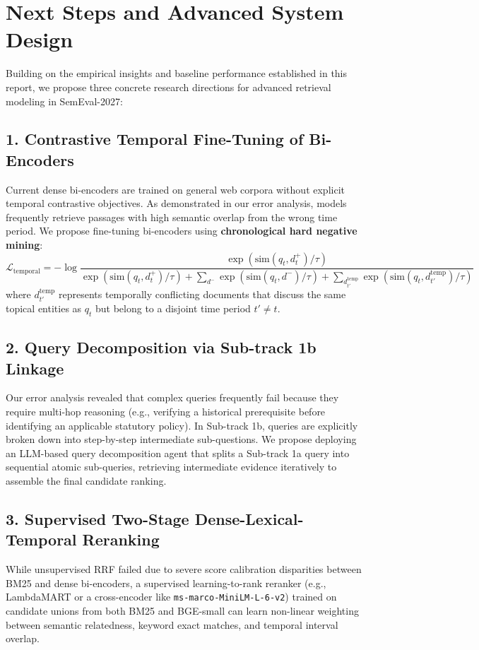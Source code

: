 \section{Next Steps and Advanced System Design}
\label{sec:nextsteps}

Building on the empirical insights and baseline performance established in this report, we propose three concrete research directions for advanced retrieval modeling in SemEval-2027:

\subsection{1. Contrastive Temporal Fine-Tuning of Bi-Encoders}
Current dense bi-encoders are trained on general web corpora without explicit temporal contrastive objectives. As demonstrated in our error analysis, models frequently retrieve passages with high semantic overlap from the wrong time period. We propose fine-tuning bi-encoders using \textbf{chronological hard negative mining}:
\begin{equation}
    \mathcal{L}_{\text{temporal}} = -\log \frac{\exp(\text{sim}(q_t, d_t^+) / \tau)}{\exp(\text{sim}(q_t, d_t^+) / \tau) + \sum_{d^-} \exp(\text{sim}(q_t, d^-) / \tau) + \sum_{d_{t'}^{\text{temp}}} \exp(\text{sim}(q_t, d_{t'}^{\text{temp}}) / \tau)}
\end{equation}
where $d_{t'}^{\text{temp}}$ represents temporally conflicting documents that discuss the same topical entities as $q_t$ but belong to a disjoint time period $t' \neq t$.

\subsection{2. Query Decomposition via Sub-track 1b Linkage}
Our error analysis revealed that complex queries frequently fail because they require multi-hop reasoning (e.g., verifying a historical prerequisite before identifying an applicable statutory policy). In Sub-track 1b, queries are explicitly broken down into step-by-step intermediate sub-questions. We propose deploying an LLM-based query decomposition agent that splits a Sub-track 1a query into sequential atomic sub-queries, retrieving intermediate evidence iteratively to assemble the final candidate ranking.

\subsection{3. Supervised Two-Stage Dense-Lexical-Temporal Reranking}
While unsupervised RRF failed due to severe score calibration disparities between BM25 and dense bi-encoders, a supervised learning-to-rank reranker (e.g., LambdaMART or a cross-encoder like \texttt{ms-marco-MiniLM-L-6-v2}) trained on candidate unions from both BM25 and BGE-small can learn non-linear weighting between semantic relatedness, keyword exact matches, and temporal interval overlap.
